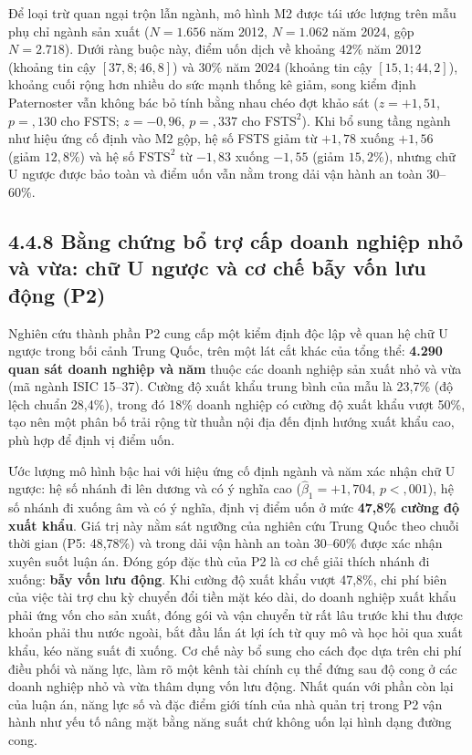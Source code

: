 \documentclass[
  a4paper,
  13pt]{extreport}
\begin{document}
Để loại trừ quan ngại trộn lẫn ngành, mô hình M2 được tái ước lượng trên
mẫu phụ chỉ ngành sản xuất (\(N = 1.656\) năm 2012, \(N = 1.062\) năm
2024, gộp \(N = 2.718\)). Dưới ràng buộc này, điểm uốn dịch về khoảng
\(42\%\) năm 2012 (khoảng tin cậy \([37{,}8; 46{,}8]\)) và \(30\%\) năm
2024 (khoảng tin cậy \([15{,}1; 44{,}2]\)), khoảng cuối rộng hơn nhiều
do sức mạnh thống kê giảm, song kiểm định Paternoster vẫn không bác bỏ
tính bằng nhau chéo đợt khảo sát (\(z = +1{,}51\), \(p = {,}130\) cho
FSTS; \(z = -0{,}96\), \(p = {,}337\) cho \(\mathrm{FSTS}^2\)). Khi bổ
sung tầng ngành như hiệu ứng cố định vào M2 gộp, hệ số FSTS giảm từ
\(+1{,}78\) xuống \(+1{,}56\) (giảm \(12{,}8\%\)) và hệ số
\(\mathrm{FSTS}^2\) từ \(-1{,}83\) xuống \(-1{,}55\) (giảm
\(15{,}2\%\)), nhưng chữ U ngược được bảo toàn và điểm uốn vẫn nằm trong
dải vận hành an toàn 30--60\%.

\hypertarget{bux1eb1ng-chux1ee9ng-bux1ed5-trux1ee3-cux1ea5p-doanh-nghiux1ec7p-nhux1ecf-vuxe0-vux1eeba-chux1eef-u-ngux1b0ux1ee3c-vuxe0-cux1a1-chux1ebf-bux1eaby-vux1ed1n-lux1b0u-ux111ux1ed9ng-p2}{%
\subsection{4.4.8 Bằng chứng bổ trợ cấp doanh nghiệp nhỏ và vừa: chữ U
ngược và cơ chế bẫy vốn lưu động
(P2)}\label{bux1eb1ng-chux1ee9ng-bux1ed5-trux1ee3-cux1ea5p-doanh-nghiux1ec7p-nhux1ecf-vuxe0-vux1eeba-chux1eef-u-ngux1b0ux1ee3c-vuxe0-cux1a1-chux1ebf-bux1eaby-vux1ed1n-lux1b0u-ux111ux1ed9ng-p2}}

Nghiên cứu thành phần P2 cung cấp một kiểm định độc lập về quan hệ chữ U
ngược trong bối cảnh Trung Quốc, trên một lát cắt khác của tổng thể:
\textbf{4.290 quan sát doanh nghiệp và năm} thuộc các doanh nghiệp sản
xuất nhỏ và vừa (mã ngành ISIC 15--37). Cường độ xuất khẩu trung bình
của mẫu là 23,7\% (độ lệch chuẩn 28,4\%), trong đó 18\% doanh nghiệp có
cường độ xuất khẩu vượt 50\%, tạo nên một phân bố trải rộng từ thuần nội
địa đến định hướng xuất khẩu cao, phù hợp để định vị điểm uốn.

Ước lượng mô hình bậc hai với hiệu ứng cố định ngành và năm xác nhận chữ
U ngược: hệ số nhánh đi lên dương và có ý nghĩa cao
(\(\hat{\beta}_1 = +1{,}704\), \(p < {,}001\)), hệ số nhánh đi xuống âm
và có ý nghĩa, định vị điểm uốn ở mức \textbf{47,8\% cường độ xuất
khẩu}. Giá trị này nằm sát ngưỡng của nghiên cứu Trung Quốc theo chuỗi
thời gian (P5: 48,78\%) và trong dải vận hành an toàn 30--60\% được xác
nhận xuyên suốt luận án. Đóng góp đặc thù của P2 là cơ chế giải thích
nhánh đi xuống: \textbf{bẫy vốn lưu động}. Khi cường độ xuất khẩu vượt
47,8\%, chi phí biên của việc tài trợ chu kỳ chuyển đổi tiền mặt kéo
dài, do doanh nghiệp xuất khẩu phải ứng vốn cho sản xuất, đóng gói và
vận chuyển từ rất lâu trước khi thu được khoản phải thu nước ngoài, bắt
đầu lấn át lợi ích từ quy mô và học hỏi qua xuất khẩu, kéo năng suất đi
xuống. Cơ chế này bổ sung cho cách đọc dựa trên chi phí điều phối và
năng lực, làm rõ một kênh tài chính cụ thể đứng sau độ cong ở các doanh
nghiệp nhỏ và vừa thâm dụng vốn lưu động. Nhất quán với phần còn lại của
luận án, năng lực số và đặc điểm giới tính của nhà quản trị trong P2 vận
hành như yếu tố nâng mặt bằng năng suất chứ không uốn lại hình dạng
đường cong.
\end{document}
